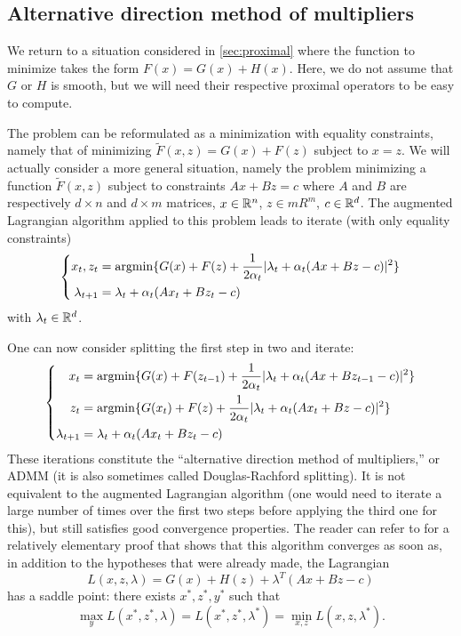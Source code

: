 \subsection{Alternative direction method of multipliers}
We return to a situation considered in \cref{sec:proximal} where the function to minimize takes the form $F(x) = G(x) + H(x)$. Here, we do not assume that $G$ or $H$ is smooth,  but we will need their respective proximal operators to be easy to compute. 

The problem can be reformulated as a minimization with equality constraints, namely that of minimizing $\tilde F(x,z) = G(x) + F(z)$ subject to $x=z$. We will actually consider a more general situation, namely the problem minimizing a function $\tilde F(x,z)$ subject to constraints $Ax + Bz = c$ where $A$ and $B$ are respectively $d\times n$ and $d\times m$ matrices, $x\in {\mathbb{R}}^n$, $z\in mR^m$, $c\in {\mathbb{R}}^d$. The augmented Lagrangian algorithm applied to this problem leads to iterate (with only equality constraints)
\[
\left\{
\begin{aligned}
x_{t}, z_t &= \operatorname*{argmin}\{ G(x) + F(z) + \frac{1}{2\alpha_t} |\lambda_t + \alpha_t (Ax + Bz - c)|^2\} \\
\lambda_{t+1} &= \lambda_t + \alpha_t (Ax_t+Bz_t -c)
\end{aligned}
\right.
\]
with $\lambda_t\in {\mathbb{R}}^d$. 

One can now consider splitting the first step in two and iterate:
\begin{equation}
\label{eq:admm.2}
\left\{
\begin{aligned}
x_{t} &= \operatorname*{argmin}\{ G(x) + F(z_{t-1}) + \frac{1}{2\alpha_t} |\lambda_t + \alpha_t (Ax + Bz_{t-1} - c)|^2\} \\
z_t &= \operatorname*{argmin}\{ G(x_t) + F(z) + \frac{1}{2\alpha_t} |\lambda_t + \alpha_t (Ax_t + Bz - c)|^2\} \\
\lambda_{t+1} &= \lambda_t + \alpha_t (Ax_t+Bz_t -c)
\end{aligned}
\right.
\end{equation}
These iterations constitute the ``alternative direction method of multipliers,'' or ADMM (it is also sometimes called Douglas-Rachford splitting). It is not equivalent to the augmented Lagrangian algorithm (one would need to iterate a large number of times over the first two steps before applying the third one for this), but still satisfies good convergence properties.  The reader can refer to \citet{boyd2011distributed} for a relatively elementary proof that shows that this algorithm converges as soon as, in addition to the hypotheses that were already made, the Lagrangian
\[
L(x,z,\lambda) = G(x) + H(z) + \lambda^T(Ax+Bz-c)
\]
has a saddle point: there exists $x^*, z^*, y^*$ such that
\[
\max_y L(x^*, z^*, \lambda) = L(x^*, z^*, \lambda^*) = \min_{x,z} L(x, z, \lambda^*).
\]


